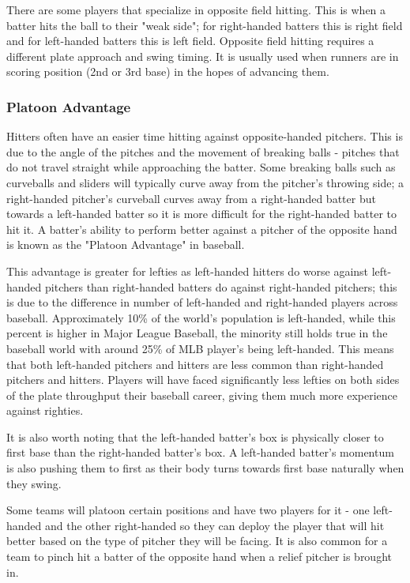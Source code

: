 \documentclass{article}
\begin{document}
There are some players that specialize in opposite field hitting. This is when a batter hits the ball to their "weak side"; for right-handed batters this is right field and for left-handed batters this is left field. Opposite field hitting requires a different plate approach and swing timing. It is usually used when runners are in scoring position (2nd or 3rd base) in the hopes of advancing them. 



\subsubsection{Platoon Advantage}
Hitters often have an easier time hitting against opposite-handed pitchers. This is due to the angle of the pitches and the movement of breaking balls - pitches that do not travel straight while approaching the batter. Some breaking balls such as curveballs and sliders will typically curve away from the pitcher's throwing side; a right-handed pitcher's curveball curves away from a right-handed batter but towards a left-handed batter so it is more difficult for the right-handed batter to hit it. A batter's ability to perform better against a pitcher of the opposite hand is known as the "Platoon Advantage" in baseball.

This advantage is greater for lefties as left-handed hitters do worse against left-handed pitchers than right-handed batters do against right-handed pitchers; this is due to the difference in number of left-handed and right-handed players across baseball. Approximately 10\% of the world's population is left-handed, while this percent is higher in Major League Baseball, the minority still holds true in the baseball world with around 25\% of MLB player's being left-handed. This means that both left-handed pitchers and hitters are less common than right-handed pitchers and hitters. Players will have faced significantly less lefties on both sides of the plate throughput their baseball career, giving them much more experience against righties. 

It is also worth noting that the left-handed batter's box is physically closer to first base than the right-handed batter's box. A left-handed batter's momentum is also pushing them to first as their body turns towards first base naturally when they swing.

Some teams will platoon certain positions and have two players for it - one left-handed and the other right-handed so they can deploy the player that will hit better based on the type of pitcher they will be facing. It is also common for a team to pinch hit a batter of the opposite hand when a relief pitcher is brought in. 
\end{document}
